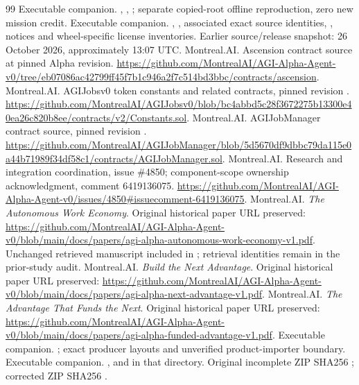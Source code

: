 \documentclass[11pt,a4paper]{article}
\begin{document}
\begin{thebibliography}{99}
 Executable companion. , , ; separate copied-root offline reproduction, zero new mission credit.
 Executable companion. , , associated exact source identities, , notices and wheel-specific license inventories. Earlier source/release snapshot: 26 October 2026, approximately 13:07 UTC.
 Montreal.AI. Ascension contract source at pinned Alpha revision. \url{https://github.com/MontrealAI/AGI-Alpha-Agent-v0/tree/eb07086ac42799ff45f7b1c946a2f7c514bd3bbc/contracts/ascension}.
 Montreal.AI. AGIJobsv0 token constants and related contracts, pinned revision . \url{https://github.com/MontrealAI/AGIJobsv0/blob/bc4abbd5c28f3672275b13300e40ea26c820b8ee/contracts/v2/Constants.sol}.
 Montreal.AI. AGIJobManager contract source, pinned revision . \url{https://github.com/MontrealAI/AGIJobManager/blob/5d5670df9dbbc79da115e0a44b71989f34df58c1/contracts/AGIJobManager.sol}.
 Montreal.AI. Research and integration coordination, issue \#4850; component-scope ownership acknowledgment, comment 6419136075. \url{https://github.com/MontrealAI/AGI-Alpha-Agent-v0/issues/4850#issuecomment-6419136075}.
 Montreal.AI. \emph{The Autonomous Work Economy}. Original historical paper URL preserved: \url{https://github.com/MontrealAI/AGI-Alpha-Agent-v0/blob/main/docs/papers/agi-alpha-autonomous-work-economy-v1.pdf}. Unchanged retrieved manuscript included in ; retrieval identities remain in the prior-study audit.
 Montreal.AI. \emph{Build the Next Advantage}. Original historical paper URL preserved: \url{https://github.com/MontrealAI/AGI-Alpha-Agent-v0/blob/main/docs/papers/agi-alpha-next-advantage-v1.pdf}.
 Montreal.AI. \emph{The Advantage That Funds the Next}. Original historical paper URL preserved: \url{https://github.com/MontrealAI/AGI-Alpha-Agent-v0/blob/main/docs/papers/agi-alpha-funded-advantage-v1.pdf}.
 Executable companion. ; exact producer layouts and unverified product-importer boundary.
 Executable companion. ,  and  in that directory. Original incomplete ZIP SHA256 ; corrected ZIP SHA256 .

\end{thebibliography}
\end{document}
